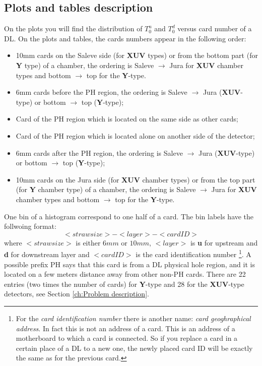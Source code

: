 \documentclass[a4paper,12pt]{article}
\begin{document}
\subsection{Plots and tables description}
On the plots you will find the distribution of
$T_0^u$ and $T_0^d$ versus card number of a DL.
On the plots and tables, the cards numbers appear in the following order:
\begin{itemize}
\item 10mm cards on the Saleve side (for {\bf XUV} types) or
from the bottom part (for {\bf Y} type) of a chamber, the ordering
is Saleve $\rightarrow$ Jura for {\bf XUV} chamber types and
bottom $\rightarrow$ top for the {\bf Y}-type.
\item 6mm cards before the PH region, the ordering is Saleve $\rightarrow$ Jura
      ({\bf XUV}-type) or bottom $\rightarrow$ top ({\bf Y}-type);
\item Card of the PH region which is located on the same side as other cards;
\item Card of the PH region which is located alone on another side of the detector;
\item 6mm cards after the PH region, the ordering is Saleve $\rightarrow$ Jura
      ({\bf XUV}-type) or bottom $\rightarrow$ top ({\bf Y}-type);
\item 10mm cards on the Jura side (for {\bf XUV} chamber types) or
from the top part (for {\bf Y} chamber type) of a chamber, the ordering
is Saleve $\rightarrow$ Jura for {\bf XUV} chamber types and
bottom $\rightarrow$ top for the {\bf Y}-type.
\end{itemize}

One bin of a histogram correspond to one half of a card.
The bin labels have the follwoing format: $$<straw size>-<layer>-<card ID>$$
where $<straw size>$ is either $6mm$ or $10mm$, $<layer>$ is 
{\bf u} for upstream and {\bf d} for downstream layer and $<card ID>$
is the card identification number
\footnote{For the {\it card identification number} there is another name:
{\it card geoghraphical address}. In fact
this is not an address of a card. This is an address of a motherboard to which
a card is connected. So if you replace a card in a certain place of a DL to
a new one, the newly placed card ID will be exactly the same as for the previous card.}.
A possible prefix PH says that this card is from a DL physical hole region,
and it is located on a few meters distance away from other non-PH cards.
There are 22 entries (two times the number of cards)
for {\bf Y}-type and 28 for the {\bf XUV}-type detectors,
see Section \ref{ch:Problem description}.
\end{document}
